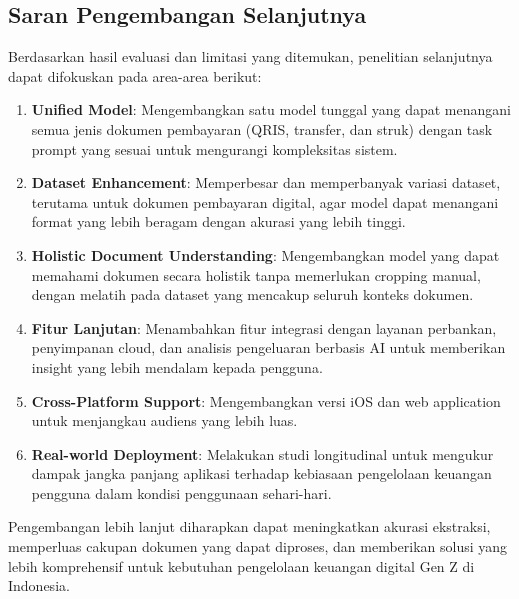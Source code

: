 \subsection{Saran Pengembangan Selanjutnya}
Berdasarkan hasil evaluasi dan limitasi yang ditemukan, penelitian selanjutnya dapat difokuskan pada area-area berikut:

\begin{enumerate}
    \item \textbf{Unified Model}: Mengembangkan satu model tunggal yang dapat menangani semua jenis dokumen pembayaran (QRIS, transfer, dan struk) dengan task prompt yang sesuai untuk mengurangi kompleksitas sistem.
    
    \item \textbf{Dataset Enhancement}: Memperbesar dan memperbanyak variasi dataset, terutama untuk dokumen pembayaran digital, agar model dapat menangani format yang lebih beragam dengan akurasi yang lebih tinggi.
    
    \item \textbf{Holistic Document Understanding}: Mengembangkan model yang dapat memahami dokumen secara holistik tanpa memerlukan cropping manual, dengan melatih pada dataset yang mencakup seluruh konteks dokumen.
    
    \item \textbf{Fitur Lanjutan}: Menambahkan fitur integrasi dengan layanan perbankan, penyimpanan cloud, dan analisis pengeluaran berbasis AI untuk memberikan insight yang lebih mendalam kepada pengguna.
    
    \item \textbf{Cross-Platform Support}: Mengembangkan versi iOS dan web application untuk menjangkau audiens yang lebih luas.
    
    \item \textbf{Real-world Deployment}: Melakukan studi longitudinal untuk mengukur dampak jangka panjang aplikasi terhadap kebiasaan pengelolaan keuangan pengguna dalam kondisi penggunaan sehari-hari.
\end{enumerate}

Pengembangan lebih lanjut diharapkan dapat meningkatkan akurasi ekstraksi, memperluas cakupan dokumen yang dapat diproses, dan memberikan solusi yang lebih komprehensif untuk kebutuhan pengelolaan keuangan digital Gen Z di Indonesia.